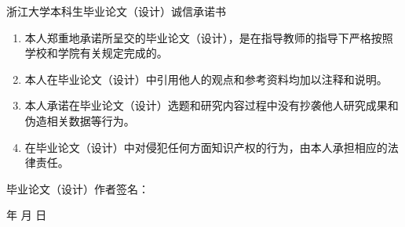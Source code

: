 
\newpage
\thispagestyle{empty}

\begin{center}
\heiti\xiaosan 浙江大学本科生毕业论文（设计）诚信承诺书
\end{center}

\vspace{5mm}

{\songti\sihao
\begin{enumerate}
  \item 本人郑重地承诺所呈交的毕业论文（设计），是在指导教师的指导下严格按照学校和学院有关规定完成的。
  \item 本人在毕业论文（设计）中引用他人的观点和参考资料均加以注释和说明。
  \item 本人承诺在毕业论文（设计）选题和研究内容过程中没有抄袭他人研究成果和伪造相关数据等行为。
  \item 在毕业论文（设计）中对侵犯任何方面知识产权的行为，由本人承担相应的法律责任。
\end{enumerate}

\vspace{12mm}
\hspace{20mm}毕业论文（设计）作者签名：
\begin{flushright}
    \underline{\hspace{4em}} 年 \underline{\hspace{2em}} 月 \underline{\hspace{2em}} 日
\end{flushright}}

